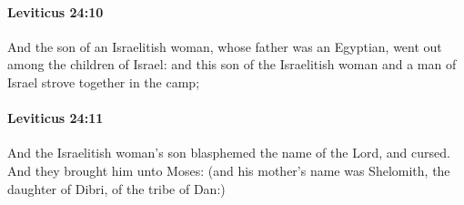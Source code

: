 		\paragraph{Leviticus 24:10} %
			\label{LEVITICUS-24-10}

			And the son of an Israelitish woman, whose father was an Egyptian, went out among the children of Israel: and this son of the Israelitish woman and a man of Israel strove together in the camp;


		\paragraph{Leviticus 24:11} %
			\label{LEVITICUS-24-11}

			And the Israelitish woman’s son blasphemed the name of the Lord, and cursed. And they brought him unto Moses: (and his mother’s name was Shelomith, the daughter of Dibri, of the tribe of Dan:)

